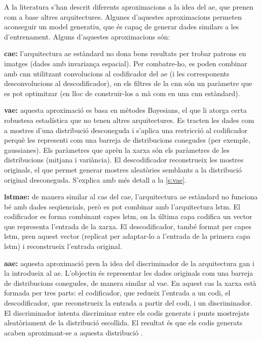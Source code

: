\documentclass[CAT,BIB]{TFUOC}%
\begin{document}
        A la literatura s'han descrit diferents aproximacions a la idea del \gls{ae}, que prenen com a base altres arquitectures. Algunes d'aquestes aproximacions permeten aconseguir un model generatiu, que és capaç de generar dades similars a les d'entrenament. Alguns d'aquestes aproximacions són:

        \textbf{\Gls{cae}:} l'arquitectura \gls{ae} estàndard no dona bons resultats per trobar patrons en imatges (dades amb invariança espacial). Per combatre-ho, es poden combinar amb \gls{cnn} utilitzant convolucions al codificador del \gls{ae} (i les corresponents desconvolucions al descodificador), on els filtres de la \gls{cnn} són un paràmetre que es pot optimitzar (en lloc de construir-los a mà com en una \gls{cnn} estàndard).

        \textbf{\Gls{vae}:} aquesta aproximació es basa en mètodes Bayesians, el que li atorga certa robustesa estadística que no tenen altres arquitectures. Es tracten les dades com a mostres d'una distribució desconeguda i s'aplica una restricció al codificador perquè les representi com una barreja de distribucions conegudes (per exemple, gaussianes). Els paràmetres que aprèn la xarxa són els paràmetres de les distribucions (mitjana i variància). El descodificador reconstrueix les mostres originals, el que permet generar mostres aleatòries semblants a la distribució original desconeguda. S'explica amb més detall a la \cref{s:vae}.

        \textbf{\Gls{lstmae}:} de manera similar al cas del \gls{cae}, l'arquitectura \gls{ae} estàndard no funciona bé amb dades seqüencials, però es pot combinar amb l'arquitectura \gls{lstm}. El codificador es forma combinant capes \gls{lstm}, on la última capa codifica un vector que representa l'entrada de la xarxa. El descodificador, també format per capes \gls{lstm}, pren aquest vector (replicat per adaptar-lo a l'entrada de la primera capa \gls{lstm}) i reconstrueix l'entrada original.

        \textbf{\Gls{aae}:} aquesta aproximació pren la idea del discriminador de la arquitectura \gls{gan} i la introdueix al \gls{ae}. L'objectiu és representar les dades originals com una barreja de distribucions conegudes, de manera similar al \gls{vae}. En aquest cas la xarxa està formada per tres parts: el codificador, que redueix l'entrada a un codi, el descodificador, que reconstrueix la entrada a partir del codi, i un discriminador. El discriminador intenta discriminar entre els codis generats i punts mostrejats aleatòriament de la distribució escollida. El resultat és que els codis generats acaben aproximant-se a aquesta distribució \citep{Makhzani2015}.
\end{document}
